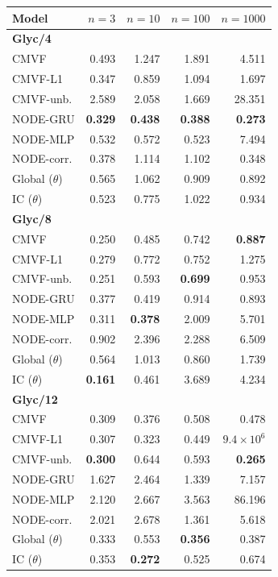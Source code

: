 \begin{tabular*}{\linewidth}{@{\extracolsep{\fill}}lrrrr}
\toprule
Model & $n=3$ & $n=10$ & $n=100$ & $n=1000$ \\
\midrule
\multicolumn{5}{l}{\textbf{Glyc/4}} \\
CMVF & 0.493 & 1.247 & 1.891 & 4.511 \\
CMVF-L1 & 0.347 & 0.859 & 1.094 & 1.697 \\
CMVF-unb. & 2.589 & 2.058 & 1.669 & 28.351 \\
NODE-GRU & \textbf{0.329} & \textbf{0.438} & \textbf{0.388} & \textbf{0.273} \\
NODE-MLP & 0.532 & 0.572 & 0.523 & 7.494 \\
NODE-corr. & 0.378 & 1.114 & 1.102 & 0.348 \\
Global ($\theta$) & 0.565 & 1.062 & 0.909 & 0.892 \\
IC ($\theta$) & 0.523 & 0.775 & 1.022 & 0.934 \\
\midrule
\multicolumn{5}{l}{\textbf{Glyc/8}} \\
CMVF & 0.250 & 0.485 & 0.742 & \textbf{0.887} \\
CMVF-L1 & 0.279 & 0.772 & 0.752 & 1.275 \\
CMVF-unb. & 0.251 & 0.593 & \textbf{0.699} & 0.953 \\
NODE-GRU & 0.377 & 0.419 & 0.914 & 0.893 \\
NODE-MLP & 0.311 & \textbf{0.378} & 2.009 & 5.701 \\
NODE-corr. & 0.902 & 2.396 & 2.288 & 6.509 \\
Global ($\theta$) & 0.564 & 1.013 & 0.860 & 1.739 \\
IC ($\theta$) & \textbf{0.161} & 0.461 & 3.689 & 4.234 \\
\midrule
\multicolumn{5}{l}{\textbf{Glyc/12}} \\
CMVF & 0.309 & 0.376 & 0.508 & 0.478 \\
CMVF-L1 & 0.307 & 0.323 & 0.449 & $9.4\!\times\!10^{6}$ \\
CMVF-unb. & \textbf{0.300} & 0.644 & 0.593 & \textbf{0.265} \\
NODE-GRU & 1.627 & 2.464 & 1.339 & 7.157 \\
NODE-MLP & 2.120 & 2.667 & 3.563 & 86.196 \\
NODE-corr. & 2.021 & 2.678 & 1.361 & 5.618 \\
Global ($\theta$) & 0.333 & 0.553 & \textbf{0.356} & 0.387 \\
IC ($\theta$) & 0.353 & \textbf{0.272} & 0.525 & 0.674 \\

\end{tabular*}

